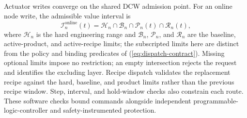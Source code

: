 Actuator writes converge on the shared DCW admission point.
For an online node write, the admissible value interval is
\begin{equation}
\mathcal{I}^{\mathrm{online}}_n(t)=
\mathcal{H}_n\cap\mathcal{B}_n\cap\mathcal{P}_n(t)\cap\mathcal{R}_n(t),
\label{eq:admission}
\end{equation}
where $\mathcal{H}_n$ is the hard engineering range and
$\mathcal{B}_n$, $\mathcal{P}_n$, and $\mathcal{R}_n$ are the baseline,
active-product, and active-recipe limits; the subscripted limits here are
distinct from the policy and binding predicates of
(\ref{eq:dispatch-contract}). Missing optional limits impose no
restriction; an empty intersection rejects the request and identifies the
excluding layer. Recipe dispatch validates the replacement recipe against
the hard, baseline, and product limits rather than the previous recipe
window. Step, interval, and hold-window checks also constrain each route.
These software checks bound commands alongside independent
programmable-logic-controller and safety-instrumented protection.



